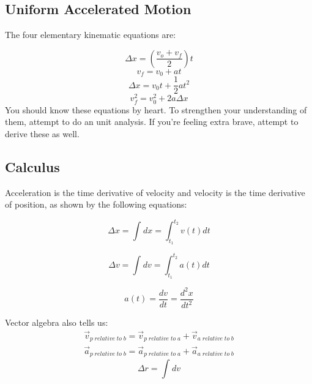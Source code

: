 \subsection{Uniform Accelerated Motion}
The four elementary kinematic equations are:

	\begin{equation}\Delta x = (\frac{v_o + v_f}{2})t\end{equation}
	\begin{equation}v_f = v_0 + at\end{equation}
	\begin{equation}\Delta x = v_0t + \frac{1}{2}at^2\end{equation}
	\begin{equation}v_f^2 = v_0^2 + 2a\Delta x\end{equation}
You should know these equations by heart. To strengthen your understanding of them, attempt to do an unit analysis. If you're feeling extra brave, attempt to derive these as well.

\subsection{Calculus}
Acceleration is the time derivative of velocity and velocity is the time derivative of position, as shown by the following equations:

    \begin{equation}
    \Delta x = \int_{ }^{ }dx = \int_{t_1}^{t_2} v(t) dt
    \end{equation}
    
    \begin{equation}
    \Delta v = \int_{ }^{ }dv = \int_{t_1}^{t_2} a(t) dt
    \end{equation}
    
    \begin{equation}
    a(t) = \frac{dv}{dt}=\frac{d^2x}{dt^2}
    \end{equation}
    
Vector algebra also tells us:
    \begin{equation}
    \begin{split}
        \vec{v}_{p\;relative\;to\;b} = 
        \vec{v}_{p\;relative\;to\;a} + \vec{v}_{a\;relative\;to\;b}
        \\
        \vec{a}_{p\;relative\;to\;b} = 
        \vec{a}_{p\;relative\;to\;a} + \vec{a}_{a\;relative\;to\;b}
    \end{split}
    \end{equation}
    \begin{equation*}
        \Delta r = \int_{ }^{ }dv
    \end{equation*}
    
